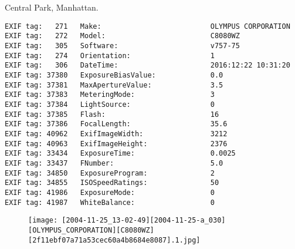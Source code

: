 \section{\protect{}}
\noindent Central Park, Manhattan.
\noindent
\begin{lstlisting}
EXIF tag:   271   Make:                          OLYMPUS CORPORATION
EXIF tag:   272   Model:                         C8080WZ
EXIF tag:   305   Software:                      v757-75
EXIF tag:   274   Orientation:                   1
EXIF tag:   306   DateTime:                      2016:12:22 10:31:20
EXIF tag: 37380   ExposureBiasValue:             0.0
EXIF tag: 37381   MaxApertureValue:              3.5
EXIF tag: 37383   MeteringMode:                  3
EXIF tag: 37384   LightSource:                   0
EXIF tag: 37385   Flash:                         16
EXIF tag: 37386   FocalLength:                   35.6
EXIF tag: 40962   ExifImageWidth:                3212
EXIF tag: 40963   ExifImageHeight:               2376
EXIF tag: 33434   ExposureTime:                  0.0025
EXIF tag: 33437   FNumber:                       5.0
EXIF tag: 34850   ExposureProgram:               2
EXIF tag: 34855   ISOSpeedRatings:               50
EXIF tag: 41986   ExposureMode:                  0
EXIF tag: 41987   WhiteBalance:                  0

\end{lstlisting}
\clearpage
\begin{figure}
\raggedleft
\texttt{[image: [2004-11-25\_13-02-49][2004-11-25-a\_030][OLYMPUS\_CORPORATION][C8080WZ][2f11ebf07a71a53cec60a4b8684e8087].1.jpg]}
\end{figure}


\clearpage
